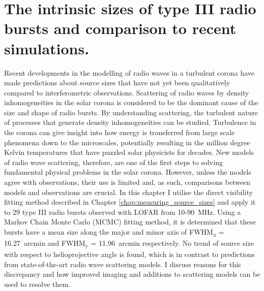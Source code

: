 \doublespacing
\chapter{The intrinsic sizes of type III radio bursts and comparison to recent simulations.}
\label{chap:observations_vs_theory}
Recent developments in the modelling of radio waves in a turbulent corona have made predictions about source sizes that have not yet been qualitatively compared to interferometric observations. Scattering of radio waves by density inhomogeneities in the solar corona is considered to be the dominant cause of the size and shape of radio bursts. By understanding scattering, the turbulent nature of processes that generate density inhomogeneities can be studied. Turbulence in the corona can give insight into how energy is transferred from large scale phenomena down to the microscales, potentially resulting in the million degree Kelvin temperatures that have puzzled solar physicists for decades. New models of radio wave scattering, therefore, are one of the first steps to solving fundamental physical problems in the solar corona. However, unless the models agree with observations, their use is limited and, as such, comparisons between models and observations are crucial. In this chapter I utilise the direct visibility fitting method described in Chapter \ref{chap:measuring_source_sizes} and apply it to 29 type III radio bursts observed with LOFAR from 10-90~MHz. Using a Markov Chain Monte Carlo (MCMC) fitting method, it is determined that these bursts have a mean size along the major and minor axis of FWHM\textsubscript{x} = 16.27~arcmin and FWHM\textsubscript{y} = 11.96~arcmin respectively. No trend of source size with respect to helioprojective angle is found, which is in contrast to predictions from state-of-the-art radio wave scattering models. I discuss reasons for this discrepancy and how improved imaging and additions to scattering models can be used to resolve them.

